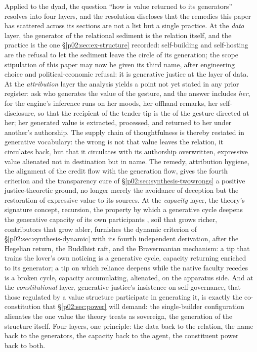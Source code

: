 Applied to the dyad, the question ``how is value returned to its generators'' resolves into four layers, and the resolution discloses that the remedies this paper has scattered across its sections are not a list but a single practice. At the \emph{data} layer, the generator of the relational sediment is the relation itself, and the practice is the one \S\ref{p02:sec:ex-structure} recorded: self-building and self-hosting are the refusal to let the sediment leave the circle of its generation; the scope stipulation of this paper may now be given its third name, after engineering choice and political-economic refusal: it is generative justice at the layer of data. At the \emph{attribution} layer the analysis yields a point not yet stated in any prior register: ask who generates the value of the gesture, and the answer includes \emph{her}, for the engine's inference runs on her moods, her offhand remarks, her self-disclosure, so that the recipient of the tender tip is the  of the gesture directed at her; her generated value is extracted, processed, and returned to her under another's authorship. The supply chain of thoughtfulness is thereby restated in generative vocabulary: the wrong is not that value leaves the relation, it circulates back, but that it circulates with its authorship overwritten, expressive value alienated not in destination but in name. The remedy, attribution hygiene, the alignment of the credit flow with the generation flow, gives the fourth criterion and the transparency cure of \S\ref{p02:sec:synthesis-twowrongs} a positive justice-theoretic ground, no longer merely the avoidance of deception but the restoration of expressive value to its sources. At the \emph{capacity} layer, the theory's signature concept, recursion, the property by which a generative cycle deepens the generative capacity of its own participants \parencite{eglash1999african,eglash2014recursive,eglash2019ai}, soil that grows richer, contributors that grow abler, furnishes the dynamic criterion of \S\ref{p02:sec:synthesis-dynamic} with its fourth independent derivation, after the Hegelian return, the Buddhist raft, and the Bravermanian mechanism: a tip that trains the lover's own noticing is a generative cycle, capacity returning enriched to its generator; a tip on which reliance deepens while the native faculty recedes is a broken cycle, capacity accumulating, alienated, on the apparatus side. And at the \emph{constitutional} layer, generative justice's insistence on self-governance, that those regulated by a value structure participate in generating it, is exactly the co-constitution that \S\ref{p02:sec:power} will demand: the single-builder configuration alienates the one value the theory treats as sovereign, the generation of the structure itself. Four layers, one principle: the data back to the relation, the name back to the generators, the capacity back to the agent, the constituent power back to both.


